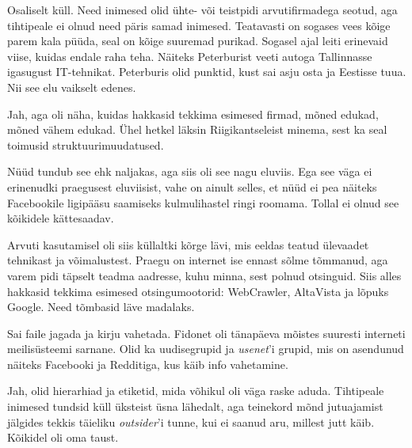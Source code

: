 
Osaliselt küll. Need inimesed olid ühte- või teistpidi 
arvutifirmadega seotud, aga tihtipeale ei olnud need päris samad 
inimesed. Teatavasti on sogases vees kõige parem kala püüda, seal on kõige 
suuremad purikad. Sogasel ajal leiti erinevaid viise, kuidas endale 
raha teha. Näiteks Peterburist veeti autoga Tallinnasse igasugust IT-tehnikat. Peterburis olid punktid, kust sai asju 
osta ja Eestisse tuua. Nii see elu vaikselt edenes.


Jah, aga oli näha, kuidas hakkasid tekkima esimesed firmad, mõned edukad, 
mõned vähem edukad. Ühel hetkel läksin Riigikantseleist 
minema, sest ka seal toimusid struktuurimuudatused.


Nüüd tundub see ehk naljakas, aga siis oli see nagu eluviis. Ega see väga ei erinenudki praegusest eluviisist, vahe on ainult selles, 
et nüüd ei pea näiteks Facebookile ligipääsu saamiseks kulmulihastel ringi roomama. Tollal ei olnud see kõikidele kättesaadav. 

Arvuti kasutamisel oli siis küllaltki kõrge lävi, mis eeldas teatud ülevaadet tehnikast ja võimalustest. Praegu on internet ise ennast 
sõlme tõmmanud, aga varem pidi täpselt teadma aadresse, 
kuhu minna, sest polnud otsinguid. Siis alles hakkasid tekkima esimesed 
otsingumootorid: WebCrawler, AltaVista ja lõpuks Google. Need tõmbasid läve madalaks. 


Sai faile jagada ja kirju vahetada. Fidonet oli tänapäeva mõistes suuresti
interneti meilisüsteemi sarnane. Olid ka uudisegrupid ja \emph{usenet}'i grupid, mis on asendunud näiteks Facebooki ja Redditiga, kus käib 
info vahetamine.


Jah, olid hierarhiad ja etiketid, mida võhikul oli väga raske 
aduda. Tihtipeale inimesed tundsid küll üksteist üsna lähedalt, aga 
teinekord mõnd jutuajamist jälgides tekkis täieliku \emph{outsider}'i tunne, kui ei saanud aru, millest jutt käib. Kõikidel oli oma taust.

